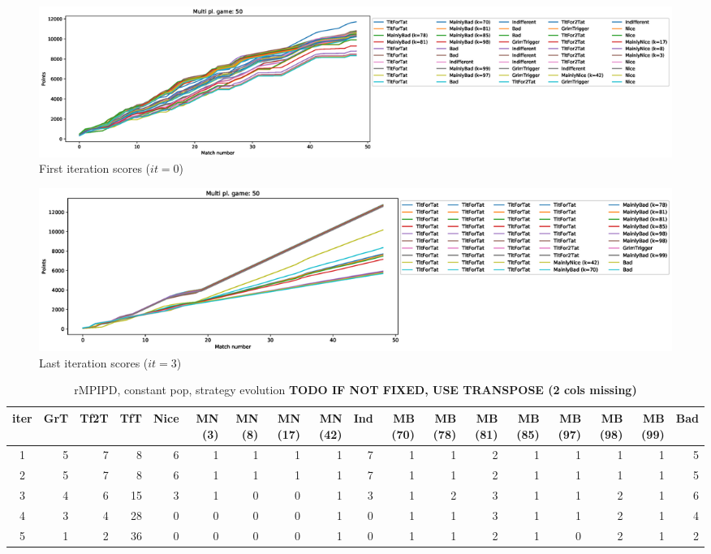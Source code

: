 \documentclass[journal,a4paper,10pt,twoside]{IEEEtran} %
\begin{document}
\begin{figure}[!ht]
    \centering
    \includegraphics[width=1\columnwidth]{../img/ripdmp-const/ripdmp-scores-const-pop-50-r0}
    \caption{First iteration scores ($it=0$)}
    \label{fig:constFI}
\end{figure}

\begin{figure}[!ht]
    \centering
    \includegraphics[width=1\columnwidth]{../img/ripdmp-const/ripdmp-scores-const-pop-50-r3}
    \caption{Last iteration scores ($it=3$)}
    \label{fig:constLI}
\end{figure}

\begin{table}[ht]
    \caption{rMPIPD, constant pop, strategy evolution \textbf{TODO IF NOT FIXED, USE TRANSPOSE (2 cols missing)}}
    \label{tab:ripdmp-const}
    \centering
    \begin{tabular}{c|rrrrrrrrrrrrrrrrr} \toprule
        iter & GrT & Tf2T & TfT & Nice & MN (3) & MN (8) & MN (17) & MN (42) & Ind & MB (70) & MB (78) & MB (81) & MB (85) & MB (97) & MB (98) & MB (99) & Bad \\ \midrule
        1 &  5 &  7 &   8 &  6 &  1 &  1 &  1 &  1 &  7 &  1 &  1 &  2 &  1 &  1 &  1 &  1 &  5 \\
        2 &  5 &  7 &   8 &  6 &  1 &  1 &  1 &  1 &  7 &  1 &  1 &  2 &  1 &  1 &  1 &  1 &  5 \\
        3 &  4 &  6 &  15 &  3 &  1 &  0 &  0 &  1 &  3 &  1 &  2 &  3 &  1 &  1 &  2 &  1 &  6 \\
        4 &  3 &  4 &  28 &  0 &  0 &  0 &  0 &  1 &  0 &  1 &  1 &  3 &  1 &  1 &  2 &  1 &  4 \\
        5 &  1 &  2 &  36 &  0 &  0 &  0 &  0 &  1 &  0 &  1 &  1 &  2 &  1 &  0 &  2 &  1 &  2 \\ \bottomrule
    \end{tabular}
\end{table}
\end{document}
